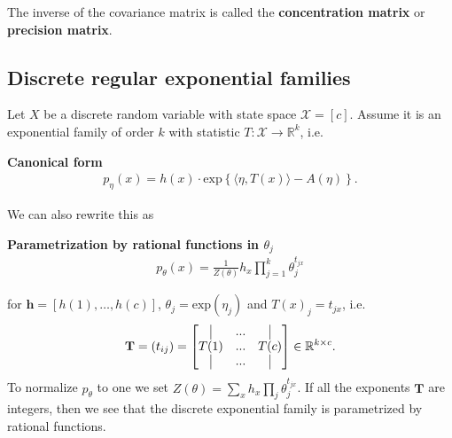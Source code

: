 \begin{defi}
  The inverse of the covariance matrix is called the \textbf{concentration matrix} or \textbf{precision matrix}.
\end{defi}

\subsection{Discrete regular exponential families}

Let \(  X \) be a discrete random variable with state space \( \mathcal{X} = [c] \). Assume it is an exponential family of order \( k \) with statistic \( T: \mathcal{X} \to \mathbb R^k \), i.e.
\begin{mdframed}
\begin{center}
\textbf{Canonical form}
\begin{align*}
  p_\eta(x) = h(x) \cdot \mathrm{exp}\left\{ \langle \eta,T(x) \rangle - A(\eta) \right\}.
\end{align*}
\end{center}
\end{mdframed}
We can also rewrite this as
\begin{mdframed}
\begin{center}
\textbf{Parametrization by rational functions in \( \theta_j \)}
\begin{align*}
  p_\theta(x) = \frac{1}{Z(\theta)}h_x \prod_{j=1}^k\theta_j^{t_{jx}}
\end{align*}
\end{center}
\end{mdframed}
for \( \mathbf h = [h(1), \dots, h(c)] \), \( \theta_j = \mathrm{exp}\left( \eta_j \right) \) and \( T(x)_{j} = t_{jx} \), i.e.
\begin{align*}
  \mathbf T= (t_{ij}) = \begin{bmatrix}
    \vline & ... & \vline \\
    T(1) & ... & T(c) \\
    \vline & ... & \vline
  \end{bmatrix} \in \mathbb R^{k \times c}.
\end{align*}
To normalize \( p_\theta \) to one we set \( Z(\theta) = \sum_x h_x \prod_j \theta_j^{t_{jx}} \). If all the exponents \( \mathbf T \) are integers, then we see that the discrete exponential family is parametrized by rational functions.

